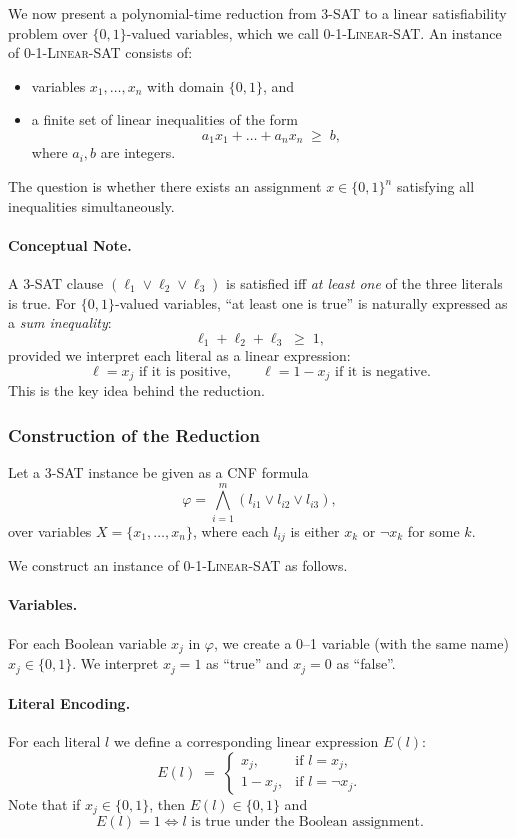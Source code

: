 \documentclass[9pt]{extarticle}
\begin{document}
We now present a polynomial-time reduction from \textsc{3-SAT} to a linear
satisfiability problem over $\{0,1\}$-valued variables, which we call
\textsc{0-1-Linear-SAT}.  An instance of \textsc{0-1-Linear-SAT} consists of:
\begin{itemize}
    \item variables $x_1,\dots,x_n$ with domain $\{0,1\}$, and
    \item a finite set of linear inequalities of the form
    \[
        a_{1}x_1 + \dots + a_{n}x_n \;\ge\; b,
    \]
    where $a_i,b$ are integers.
\end{itemize}
The question is whether there exists an assignment $x \in \{0,1\}^n$
satisfying all inequalities simultaneously.

\paragraph{Conceptual Note.}
A 3-SAT clause $(\ell_1 \lor \ell_2 \lor \ell_3)$ is satisfied iff \emph{at least
one} of the three literals is true.  For $\{0,1\}$-valued variables, “at least
one is true” is naturally expressed as a \emph{sum inequality}:
\[
\ell_1 + \ell_2 + \ell_3 \;\ge\; 1,
\]
provided we interpret each literal as a linear expression:
\[
\ell = x_j \text{ if it is positive}, \qquad
\ell = 1 - x_j \text{ if it is negative}.
\]
This is the key idea behind the reduction.

\subsubsection*{Construction of the Reduction}

Let a 3-SAT instance be given as a CNF formula
\[
\varphi = \bigwedge_{i=1}^m (l_{i1} \lor l_{i2} \lor l_{i3}),
\]
over variables $X = \{x_1,\dots,x_n\}$, where each $l_{ij}$ is either $x_k$ or
$\neg x_k$ for some $k$.

We construct an instance of \textsc{0-1-Linear-SAT} as follows.

\paragraph{Variables.}
For each Boolean variable $x_j$ in $\varphi$, we create a 0–1 variable (with the
same name) $x_j \in \{0,1\}$.  We interpret $x_j = 1$ as ``true'' and
$x_j = 0$ as ``false''.

\paragraph{Literal Encoding.}
For each literal $l$ we define a corresponding linear expression $E(l)$:
\[
E(l) \;=\;
\begin{cases}
x_j, & \text{if } l = x_j,\\
1 - x_j, & \text{if } l = \neg x_j.
\end{cases}
\]
Note that if $x_j \in \{0,1\}$, then $E(l) \in \{0,1\}$ and
\[
E(l) = 1 \iff l \text{ is true under the Boolean assignment}.
\]
\end{document}
